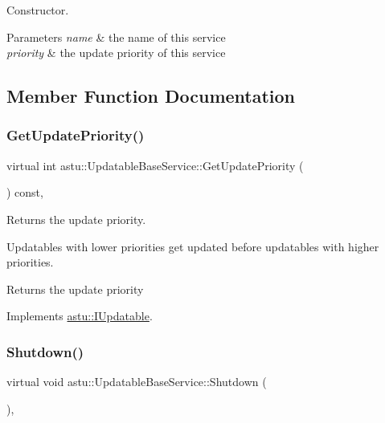 Constructor.


\begin{DoxyParams}{Parameters}
{\em name} & the name of this service \\
\hline
{\em priority} & the update priority of this service \\
\hline
\end{DoxyParams}


\subsection{Member Function Documentation}
\mbox{\label{classastu_1_1UpdatableBaseService_a22a9824510d94fa97efb962ae38be945}} 
\subsubsection{\texorpdfstring{Get\+Update\+Priority()}{GetUpdatePriority()}}
{\footnotesize\ttfamily virtual int astu\+::\+Updatable\+Base\+Service\+::\+Get\+Update\+Priority (\begin{DoxyParamCaption}{ }\end{DoxyParamCaption}) const\hspace{0.3cm}{\ttfamily [override]}, {\ttfamily [virtual]}}

Returns the update priority.

Updatables with lower priorities get updated before updatables with higher priorities.

\begin{DoxyReturn}{Returns}
the update priority 
\end{DoxyReturn}


Implements \hyperlink{classastu_1_1IUpdatable_a1bf76b0fce2360b8ade25ef9ae9e3065}{astu\+::\+I\+Updatable}.

\mbox{\label{classastu_1_1UpdatableBaseService_a7ad7e0201007878b6014361dd5ba82f9}} 
\subsubsection{\texorpdfstring{Shutdown()}{Shutdown()}}
{\footnotesize\ttfamily virtual void astu\+::\+Updatable\+Base\+Service\+::\+Shutdown (\begin{DoxyParamCaption}{ }\end{DoxyParamCaption})\hspace{0.3cm}{\ttfamily [override]}, {\ttfamily [virtual]}}

